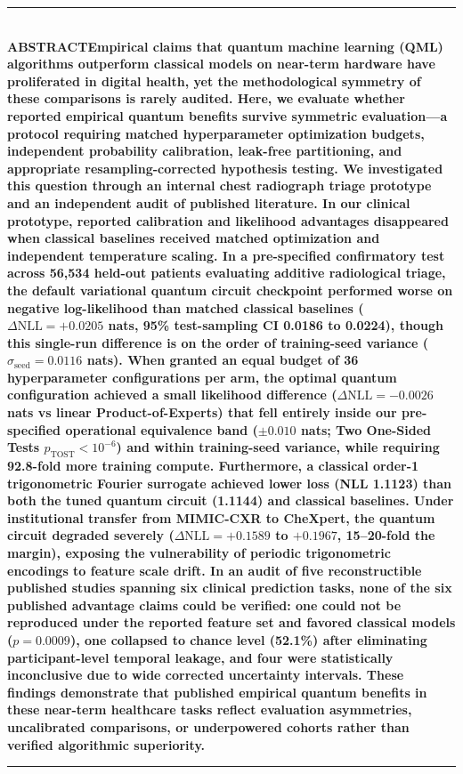 \documentclass[10pt,a4paper,twoside]{article}
\begin{document}
\noindent\rule{\textwidth}{0.4pt}\\[6pt]
\noindent\textbf{\textsf{ABSTRACT}}\quad\textbf{Empirical claims that quantum machine learning (QML) algorithms outperform classical models on near-term hardware have proliferated in digital health, yet the methodological symmetry of these comparisons is rarely audited. Here, we evaluate whether reported empirical quantum benefits survive symmetric evaluation---a protocol requiring matched hyperparameter optimization budgets, independent probability calibration, leak-free partitioning, and appropriate resampling-corrected hypothesis testing. We investigated this question through an internal chest radiograph triage prototype and an independent audit of published literature. In our clinical prototype, reported calibration and likelihood advantages disappeared when classical baselines received matched optimization and independent temperature scaling. In a pre-specified confirmatory test across 56,534 held-out patients evaluating additive radiological triage, the default variational quantum circuit checkpoint performed worse on negative log-likelihood than matched classical baselines ($\Delta\text{NLL} = +0.0205$ nats, 95\% test-sampling CI 0.0186 to 0.0224), though this single-run difference is on the order of training-seed variance ($\sigma_{\text{seed}} = 0.0116$ nats). When granted an equal budget of 36 hyperparameter configurations per arm, the optimal quantum configuration achieved a small likelihood difference ($\Delta\text{NLL} = -0.0026$ nats vs linear Product-of-Experts) that fell entirely inside our pre-specified operational equivalence band ($\pm 0.010$ nats; Two One-Sided Tests $p_{\text{TOST}} < 10^{-6}$) and within training-seed variance, while requiring 92.8-fold more training compute. Furthermore, a classical order-1 trigonometric Fourier surrogate achieved lower loss (NLL 1.1123) than both the tuned quantum circuit (1.1144) and classical baselines. Under institutional transfer from MIMIC-CXR to CheXpert, the quantum circuit degraded severely ($\Delta\text{NLL} = +0.1589$ to $+0.1967$, 15--20-fold the margin), exposing the vulnerability of periodic trigonometric encodings to feature scale drift. In an audit of five reconstructible published studies spanning six clinical prediction tasks, none of the six published advantage claims could be verified: one could not be reproduced under the reported feature set and favored classical models ($p = 0.0009$), one collapsed to chance level (52.1\%) after eliminating participant-level temporal leakage, and four were statistically inconclusive due to wide corrected uncertainty intervals. These findings demonstrate that published empirical quantum benefits in these near-term healthcare tasks reflect evaluation asymmetries, uncalibrated comparisons, or underpowered cohorts rather than verified algorithmic superiority.}\\[6pt]
\noindent\rule{\textwidth}{0.4pt}
\vspace{10pt}
\end{document}
